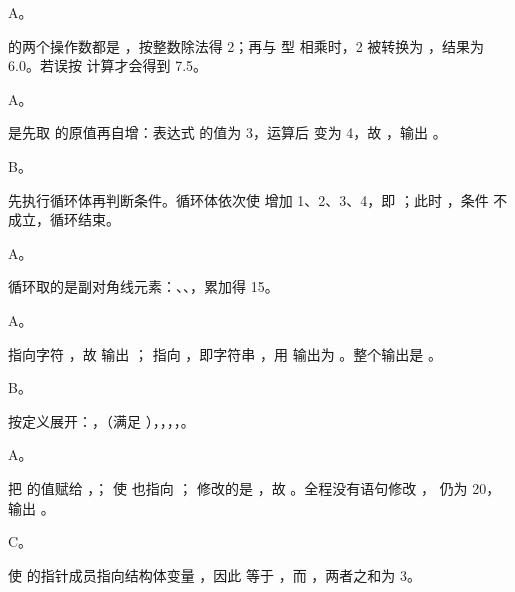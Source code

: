 \documentclass[a4paper,11pt]{article}
\begin{document}

\begin{qgroup}
\q A。
\begin{analysis}
 的两个操作数都是 ，按整数除法得 2；再与  型  相乘时，2 被转换为 ，结果为 6.0。若误按  计算才会得到 7.5。
\end{analysis}

\q A。
\begin{analysis}
 是先取  的原值再自增：表达式  的值为 3，运算后  变为 4，故 ，输出 。
\end{analysis}

\q B。
\begin{analysis}
 先执行循环体再判断条件。循环体依次使  增加 1、2、3、4，即 ；此时 ，条件  不成立，循环结束。
\end{analysis}

\q A。
\begin{analysis}
循环取的是副对角线元素：、、，累加得 15。
\end{analysis}

\q A。
\begin{analysis}
 指向字符 ，故  输出 ； 指向 ，即字符串 ，用  输出为 。整个输出是 。
\end{analysis}

\q B。
\begin{analysis}
按定义展开：，（满足 ），，，，。
\end{analysis}

\q A。
\begin{analysis}
 把  的值赋给 ，； 使  也指向 ； 修改的是 ，故 。全程没有语句修改 ， 仍为 20，输出 。
\end{analysis}

\q C。
\begin{analysis}
 使  的指针成员指向结构体变量 ，因此  等于 ，而 ，两者之和为 3。
\end{analysis}


\end{qgroup}
\end{document}
